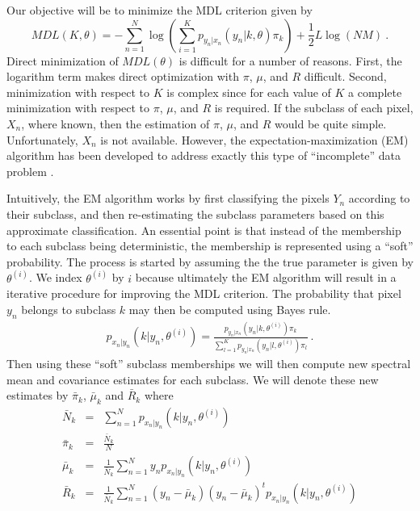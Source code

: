 \documentclass[12pt]{article}
\begin{document}
Our objective will be to minimize the MDL criterion
given by
\begin{equation}
MDL(K,\theta) = -\sum_{n=1}^N \log \left( \sum_{i=1}^K
p_{y_n|x_n}(y_n | k,\theta) \pi_k \right)
+\frac{1}{2} L \log (NM)  \ .
\label{eq:MDL}
\end{equation}
Direct minimization of $MDL(\theta)$ is difficult for a number
of reasons.
First, the logarithm term makes direct optimization with
$\pi$, $\mu$, and $R$ difficult.
Second, minimization with respect to $K$ is complex since
for each value of $K$ a complete minimization with respect
to $\pi$, $\mu$, and $R$ is required.
If the subclass of each pixel, $X_n$, where known, then the estimation
of $\pi$, $\mu$, and $R$ would be quite simple.
Unfortunately, $X_n$ is not available. 
However, the expectation-maximization (EM) algorithm has been developed
to address exactly this type 
of ``incomplete'' data problem \cite{BaPeSoWe70,DeLaRu77}.

Intuitively, the EM algorithm works 
by first classifying the pixels $Y_n$ according
to their subclass,
and then re-estimating the subclass parameters based on this
approximate classification.
An essential point is that instead of the membership to each subclass
being deterministic,
the membership is represented using a ``soft'' probability.
The process is started by assuming the the true parameter
is given by $\theta^{(i)}$.
We index $\theta^{(i)}$ by $i$ because ultimately
the EM algorithm will result in a iterative procedure
for improving the MDL criterion.
The probability that pixel $y_n$ belongs to subclass $k$ may
then be computed using Bayes rule.
\begin{eqnarray*}
p_{x_n|y_n} (k|y_n,\theta^{(i)}) = 
\frac{p_{y_n|x_n} (y_n|k,\theta^{(i)}) \pi_k}
     {\sum_{l=1}^K p_{y_n|x_n} (y_n|l,\theta^{(i)}) \pi_l} \ .
\end{eqnarray*}
Then using these ``soft'' subclass memberships we will
then compute
new spectral mean and covariance estimates for each subclass.
We will denote these new estimates 
by $\bar{\pi}_k$, $\bar{\mu}_k$ and $\bar{R}_k$
where
\begin{eqnarray}
\label{eq:bar_values1}
\bar{N}_k &=& \sum_{n=1}^N p_{x_n|y_n} (k|y_n,\theta^{(i)}) \\
\label{eq:bar_values2}
\bar{\pi}_k &=& \frac{ \bar{N}_k }{N}\\
\label{eq:bar_values3}
\bar{\mu}_k &=& \frac{1}{\bar{N}_k}\sum_{n=1}^N y_n 
                p_{x_n|y_n} (k|y_n,\theta^{(i)}) \\
\label{eq:bar_values4}
\bar{R}_k &=& \frac{1}{\bar{N}_k}\sum_{n=1}^N 
(y_n-\bar{\mu}_k)(y_n-\bar{\mu}_k)^t p_{x_n|y_n} (k|y_n,\theta^{(i)})
\end{eqnarray}
\end{document}

